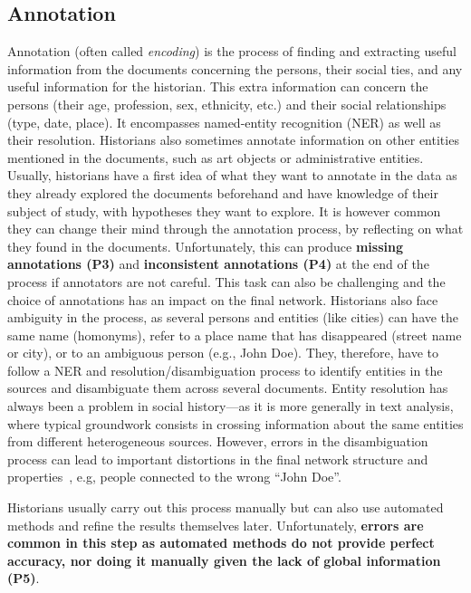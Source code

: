 \subsection{Annotation}
Annotation (often called \emph{encoding}) is the process of finding and extracting useful information from the documents concerning the persons, their social ties, and any useful information for the historian.
This extra information can concern the persons (their age, profession, sex, ethnicity, etc.) and their social relationships (type, date, place).
It encompasses named-entity recognition (NER) as well as their resolution.
Historians also sometimes annotate information on other entities mentioned in the documents, such as art objects or administrative entities.
Usually, historians have a first idea of what they want to annotate in the data as they already explored the documents beforehand and have knowledge of their subject of study, with hypotheses they want to explore.
It is however common they can change their mind through the annotation process, by reflecting on what they found in the documents.
Unfortunately, this can produce \textbf{missing annotations (P3)} and \textbf{inconsistent annotations (P4)} at the end of the process if annotators are not careful.
This task can also be challenging and the choice of annotations has an impact on the final network.
Historians also face ambiguity in the process, as several persons and entities (like cities) can have the same name (homonyms), refer to a place name that has disappeared (street name or city), or to an ambiguous person (e.g., John Doe).
They, therefore, have to follow a NER and resolution/disambiguation process to identify entities in the sources and disambiguate them across several documents.
Entity resolution has always been a problem in social history---as it is more generally in text analysis, where typical groundwork consists in crossing information about the same entities from different heterogeneous sources.
However, errors in the disambiguation process can lead to important distortions in the final network structure and properties~\cite{diesnerImpactEntityDisambiguation2015}, e.g, people connected to the wrong ``John Doe''.

Historians usually carry out this process manually but can also use automated methods and refine the results themselves later.
Unfortunately, \textbf{errors are common in this step as automated methods do not provide perfect accuracy, nor doing it manually given the lack of global information (P5)}.

